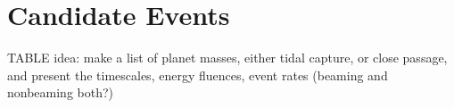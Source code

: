 \section{Candidate Events}\label{section:candidates}

TABLE idea:
make a list of planet masses, either tidal capture, or close passage, and present the timescales, energy fluences, event rates (beaming and 
nonbeaming both?)
